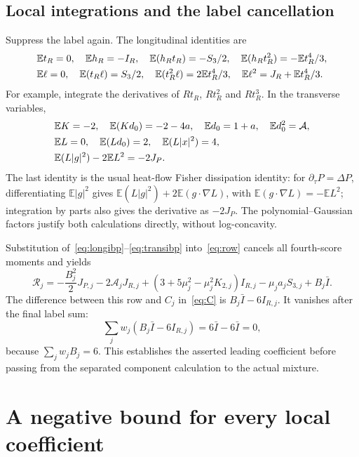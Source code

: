 \documentclass[11pt]{article}
\numberwithin{equation}{section}
\newcommand{\E}{\mathbb E}
\begin{document}
\subsection{Local integrations and the label cancellation}
Suppress the label again. The longitudinal identities are
\begin{align}
 &\E t_R=0,\quad \E h_R=-I_R,\quad
 \E(h_Rt_R)=-S_3/2,\quad
 \E(h_Rt_R^2)=-\E t_R^4/3,\notag\\
 &\E\ell=0,\quad \E(t_R\ell)=S_3/2,\quad
 \E(t_R^2\ell)=2\E t_R^4/3,\quad
 \E\ell^2=J_R+\E t_R^4/3.\label{eq:longibp}
\end{align}
For example, integrate the derivatives of \(Rt_R\), \(Rt_R^2\) and
\(Rt_R^3\). In the transverse variables,
\begin{align}
 &\E K=-2,\quad\E(Kd_0)=-2-4a,\quad
 \E d_0=1+a,\quad \E d_0^2=\mathcal A,\notag\\
 &\E L=0,\quad\E(Ld_0)=2,\quad\E(L|x|^2)=4,\notag\\
 &\E(L|g|^2)-2\E L^2=-2J_P.\label{eq:transibp}
\end{align}
The last identity is the usual heat-flow Fisher dissipation identity:
for \(\partial_\tau P=\Delta P\), differentiating \(\E|g|^2\) gives
\(\E(L|g|^2)+2\E(g\cdot\nabla L)\), with
\(\E(g\cdot\nabla L)=-\E L^2\); integration by parts also gives
the derivative as \(-2J_P\). The polynomial--Gaussian factors justify
both calculations directly, without log-concavity.

Substitution of~\eqref{eq:longibp}--\eqref{eq:transibp}
into~\eqref{eq:row} cancels all fourth-score moments and yields
\begin{equation}\label{eq:rawrow}
 \mathcal R_j=-\frac{B_j^2}{2}J_{P,j}-2\mathcal A_jJ_{R,j}
 +(3+5\mu_j^2-\mu_j^2K_{2,j})I_{R,j}
 -\mu_ja_jS_{3,j}+B_j\bar I.
\end{equation}
The difference between this row and \(C_j\) in~\eqref{eq:C} is
\(B_j\bar I-6I_{R,j}\). It vanishes after the final label sum:
\begin{equation}\label{eq:redistribution}
 \sum_jw_j( B_j\bar I-6I_{R,j})
   =6\bar I-6\bar I=0,
\end{equation}
because \(\sum_jw_jB_j=6\). This establishes the asserted leading
coefficient before passing from the separated component calculation
to the actual mixture.

\section{A negative bound for every local coefficient}\label{sec:sign}
\end{document}
